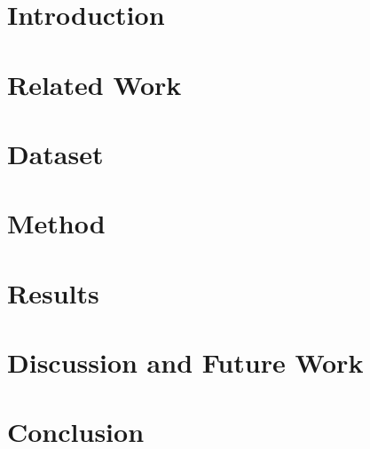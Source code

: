 \documentclass[conference, compsoc, letterpaper]{IEEEtran}
\begin{document}


\maketitle

\IEEEcompsoctitleabstractindextext{
	\begin{abstract}
	\boldmath
	
	\end{abstract}
}

\IEEEdisplaynotcompsoctitleabstractindextext
\IEEEpeerreviewmaketitle

\section{Introduction}


\section{Related Work}


\section{Dataset}


\section{Method}


\section{Results}


\section{Discussion and Future Work}


\section{Conclusion}


% 

% 

\ifCLASSOPTIONcaptionsoff
  \newpage
\fi



\end{document}
